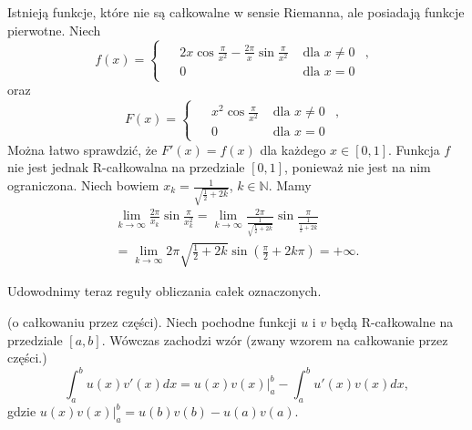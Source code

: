 \documentclass[leqno]{article}
\begin{document}
\begin{justify}
\begin{ex}
    Istnieją funkcje, które nie są całkowalne w sensie Riemanna, ale posiadają funkcje pierwotne. Niech
    \begin{equation*}
        f(x) = 
            \begin{cases}
                \begin{aligned}
                    &2x\cos \frac{\pi}{x^2} - \frac{2\pi}{x}\sin \frac{\pi}{x^2} &\text{ dla } x \neq 0&, \\
                    &0 &\text{ dla } x = 0&
                \end{aligned}
            \end{cases}
    \end{equation*}
    oraz
    \begin{equation*}
        F(x) = 
            \begin{cases}
                \begin{aligned}
                    &x^2 \cos \frac{\pi}{x^2} &\text{ dla } x \neq 0&, \\
                    &0 &\text{ dla } x = 0&
                \end{aligned}
            \end{cases}
    \end{equation*}
    Można łatwo sprawdzić, że $F'(x) = f(x)$ dla każdego $x \in [0,1]$. Funkcja $f$ nie jest jednak
    R-całkowalna na przedziale $[0,1]$, ponieważ nie jest na nim ograniczona. Niech bowiem
    $x_k = \frac{1}{\sqrt{\frac{1}{2}+2k}}$, $k \in \mathbb{N}$. Mamy
    \begin{equation*}
        \begin{split}
        \lim\limits_{k \to \infty}\frac{2\pi}{x_k} \sin \frac{\pi}{x^2_k} = \lim\limits_{k \to \infty}\frac{2\pi}{\frac{1}{\sqrt{\frac{1}{2}+2k}}} \sin \frac{\pi}{\frac{1}{\frac{1}{2} + 2k}} \\ 
        = \lim\limits_{k \to \infty}2\pi \sqrt{\frac{1}{2} + 2k}\sin(\frac{\pi}{2} + 2k\pi) = +\infty.
        \end{split}
    \end{equation*}
\end{ex}

Udowodnimy teraz reguły obliczania całek oznaczonych.

\begin{theorem}
{
    (o całkowaniu przez części). Niech pochodne funkcji $u$ i $v$ będą R-całkowalne
    na przedziale $[a,b]$. Wówczas zachodzi wzór (zwany wzorem na całkowanie przez części.)
    \[
        \int_{a}^{b}u(x)v'(x)dx = u(x)v(x) \big|_a^b - \int_{a}^{b}u'(x)v(x)dx,
    \]
    gdzie $u(x)v(x) \big|_a^b = u(b)v(b) - u(a)v(a)$.
}
\end{theorem}


\end{justify}
\end{document}
